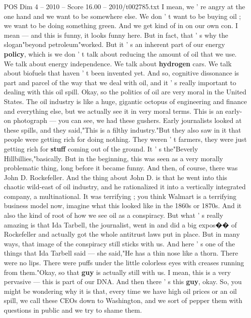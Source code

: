 \begin{textsample}{POS Dim 4 – 2010 – Score 16.00 – 2010/t002785.txt}
I mean, we ' re angry at the one hand and we want to be somewhere else.
We don ' t want to be buying oil ; we want to be doing something green.
And we get kind of in on our own con.
I mean — and this is funny, it looks funny here.
But in fact, that ' s why the slogan"beyond petroleum"worked.
But it ' s an inherent part of our energy \textbf{policy}, which is we don ' t talk about reducing the amount of oil that we use.
We talk about energy independence.
We talk about \textbf{hydrogen} cars.
We talk about biofuels that haven ' t been invented yet.
And so, cognitive dissonance is part and parcel of the way that we deal with oil, and it ' s really important to dealing with this oil spill.
Okay, so the politics of oil are very moral in the United States.
The oil industry is like a huge, gigantic octopus of engineering and finance and everything else, but we actually see it in very moral terms.
This is an early- on photograph — you can see, we had these gushers.
Early journalists looked at these spills, and they said,"This is a filthy industry."But they also saw in it that people were getting rich for doing nothing.
They weren ' t farmers, they were just getting rich for \textbf{stuff} coming out of the ground.
It ' s the"Beverly Hillbillies,"basically.
But in the beginning, this was seen as a very morally problematic thing, long before it became funny.
And then, of course, there was John D.
Rockefeller.
And the thing about John D. is that he went into this chaotic wild-east of oil industry, and he rationalized it into a vertically integrated company, a multinational.
It was terrifying ; you think Walmart is a terrifying business model now, imagine what this looked like in the 1860s or 1870s.
And it also the kind of root of how we see oil as a conspiracy.
But what ' s really amazing is that Ida Tarbell, the journalist, went in and did a big expos{\EmojiFont �}{\EmojiFont �} of Rockefeller and actually got the whole antitrust laws put in place.
But in many ways, that image of the conspiracy still sticks with us.
And here ' s one of the things that Ida Tarbell said — she said,"He has a thin nose like a thorn.
There were no lips.
There were puffs under the little colorless eyes with creases running from them."Okay, so that \textbf{guy} is actually still with us.
I mean, this is a very pervasive — this is part of our DNA.
And then there ' s this \textbf{guy}, okay.
So, you might be wondering why it is that, every time we have high oil prices or an oil spill, we call these CEOs down to Washington, and we sort of pepper them with questions in public and we try to shame them.

\end{textsample}

